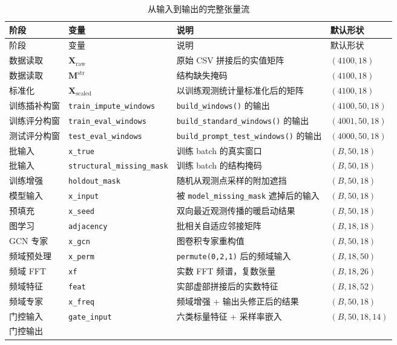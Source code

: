\documentclass[UTF8,11pt,a4paper]{ctexart}
\begin{document}
\begin{longtable}{@{}p{3.0cm} p{3.7cm} p{5.0cm} p{2.4cm}@{}}
\caption{从输入到输出的完整张量流}\\
\toprule
阶段 & 变量 & 说明 & 默认形状 \\
\midrule
\endfirsthead
\toprule
阶段 & 变量 & 说明 & 默认形状 \\
\midrule
\endhead
\bottomrule
\endfoot
数据读取 &
$\bm{X}_{\mathrm{raw}}$ &
原始 CSV 拼接后的实值矩阵 &
$(4100,18)$ \\
数据读取 &
$\bm{M}^{\mathrm{str}}$ &
结构缺失掩码 &
$(4100,18)$ \\
标准化 &
$\bm{X}_{\mathrm{scaled}}$ &
以训练观测统计量标准化后的矩阵 &
$(4100,18)$ \\
训练插补构窗 &
\texttt{train\_impute\_windows} &
\texttt{build\_windows()} 的输出 &
$(4100,50,18)$ \\
训练评分构窗 &
\texttt{train\_eval\_windows} &
\texttt{build\_standard\_windows()} 的输出 &
$(4001,50,18)$ \\
测试评分构窗 &
\texttt{test\_eval\_windows} &
\texttt{build\_prompt\_test\_windows()} 的输出 &
$(4000,50,18)$ \\
批输入 &
\texttt{x\_true} &
训练 batch 的真实窗口 &
$(B,50,18)$ \\
批输入 &
\texttt{structural\_missing\_mask} &
训练 batch 的结构掩码 &
$(B,50,18)$ \\
训练增强 &
\texttt{holdout\_mask} &
随机从观测点采样的附加遮挡 &
$(B,50,18)$ \\
模型输入 &
\texttt{x\_input} &
被 \texttt{model\_missing\_mask} 遮掉后的输入 &
$(B,50,18)$ \\
预填充 &
\texttt{x\_seed} &
双向最近观测传播的暖启动结果 &
$(B,50,18)$ \\
图学习 &
\texttt{adjacency} &
批相关自适应邻接矩阵 &
$(B,18,18)$ \\
GCN 专家 &
\texttt{x\_gcn} &
图卷积专家重构值 &
$(B,50,18)$ \\
频域预处理 &
\texttt{x\_perm} &
\texttt{permute(0,2,1)} 后的频域输入 &
$(B,18,50)$ \\
频域 FFT &
\texttt{xf} &
实数 FFT 频谱，复数张量 &
$(B,18,26)$ \\
频域特征 &
\texttt{feat} &
实部虚部拼接后的实数特征 &
$(B,18,52)$ \\
频域专家 &
\texttt{x\_freq} &
频域增强 + 输出头修正后的结果 &
$(B,50,18)$ \\
门控输入 &
\texttt{gate\_input} &
六类标量特征 + 采样率嵌入 &
$(B,50,18,14)$ \\
门控输出 &

\end{longtable}
\end{document}
